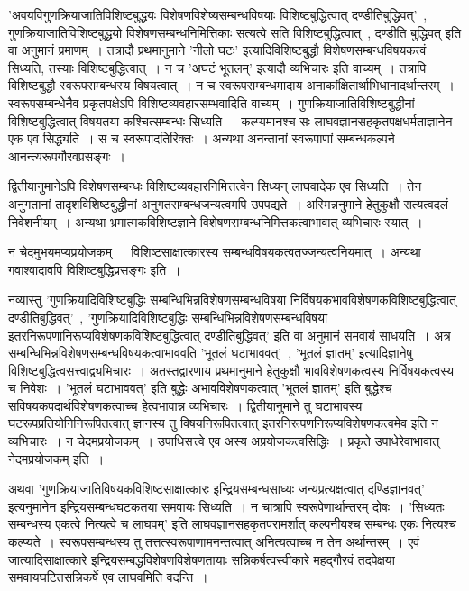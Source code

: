 		'अवयविगुणक्रियाजातिविशिष्टबुद्धयः विशेषणविशेष्यसम्बन्धविषयाः विशिष्टबुद्धित्वात् दण्डीतिबुद्धिवत्'~,  गुणक्रियाजातिविशिष्टबुद्धयो विशेषणसम्बन्धनिमित्तिकाः सत्यत्वे सति विशिष्टबुद्धित्वात्~, दण्डीति बुद्धिवत् इति वा अनुमानं  प्रमाणम्~। तत्रादौ प्रथमानुमाने 'नीलो घटः' इत्यादिविशिष्टबुद्धौ विशेषणसम्बन्धविषयकत्वं सिध्यति, तस्याः विशिष्टबुद्धित्वात्~। न च 'अघटं भूतलम्' इत्यादौ व्यभिचारः इति वाच्यम्~। तत्रापि विशिष्टबुद्धौ स्वरूपसम्बन्धस्य विषयत्वात्~। न च स्वरूपसम्बन्धमादाय अनाकांक्षितार्थाभिधानादर्थान्तरम्~। स्वरूपसम्बन्धेनैव प्रकृतपक्षेऽपि विशिष्टव्यवहारसम्भवादिति वाच्यम्~। गुणक्रियाजातिविशिष्टबुद्धीनां विशिष्टबुद्धित्वात् विषयतया कश्चित्सम्बन्धः सिध्यति~। कल्प्यमानश्च सः लाघवज्ञानसहकृतपक्षधर्मताज्ञानेन एक एव सिद्ध्यति~। स च स्वरूपादतिरिक्तः~। अन्यथा अनन्तानां स्वरूपाणां सम्बन्धकल्पने आनन्त्यरूपगौरवप्रसङ्गः~।

		द्वितीयानुमानेऽपि विशेषणसम्बन्धः विशिष्टव्यवहारनिमित्तत्वेन सिध्यन् लाघवादेक एव सिध्यति~। तेन अनुगतानां तादृशविशिष्टबुद्धीनां अनुगतसम्बन्धजन्यत्वमपि उपपद्यते~। अस्मिन्ननुमाने हेतुकुक्षौ सत्यत्वदलं निवेशनीयम्~। अन्यथा भ्रमात्मकविशिष्टज्ञाने विशेषणसम्बन्धनिमित्तकत्वाभावात् व्यभिचारः स्यात्~। 

		न चेदमुभयमप्यप्रयोजकम्~। विशिष्टसाक्षात्कारस्य सम्बन्धविषयकत्वतज्जन्यत्वनियमात्~। अन्यथा गवाश्वादावपि विशिष्टबुद्धिप्रसङ्गः इति~।

		नव्यास्तु 'गुणक्रियादिविशिष्टबुद्धिः सम्बन्धिभिन्नविशेषणसम्बन्धविषया निर्विषयकभावविशेषणकविशिष्टबुद्धित्वात् दण्डीतिबुद्धिवत्'~, 'गुणक्रियादिविशिष्टबुद्धिः सम्बन्धिभिन्नविशेषणसम्बन्धविषया इतरनिरूपणानिरूप्यविशेषणकविशिष्टबुद्धित्वात् दण्डीतिबुद्धिवत्' इति वा अनुमानं समवायं साधयति~। अत्र सम्बन्धिभिन्नविशेषणसम्बन्धविषयकत्वाभाववति 'भूतलं घटाभाववत्'~, 'भूतलं ज्ञातम्' इत्यादिज्ञानेषु विशिष्टबुद्धित्वसत्त्वाद्व्यभिचारः~। अतस्तद्वारणाय प्रथमानुमाने हेतुकुक्षौ भावविशेषणकत्वस्य निर्विषयकत्वस्य च निवेशः~। 'भूतलं घटाभाववत्' इति बुद्धेः‌ अभावविशेषणकत्वात् 'भूतलं ज्ञातम्' इति बुद्धेश्च सविषयकपदार्थविशेषणकत्वाच्च हेत्वभावान्न व्यभिचारः~। द्वितीयानुमाने तु घटाभावस्य घटरूपप्रतियोगिनिरूपितत्वात् ज्ञानस्य तु विषयनिरूपितत्वात् इतरनिरूपणनिरूप्यविशेषणकत्वमेव इति न व्यभिचारः~। न चेदमप्रयोजकम्~। उपाधिसत्त्वे एव अस्य अप्रयोजकत्वसिद्धिः~। प्रकृते उपाधेरेवाभावात् नेदमप्रयोजकम् इति~।

		अथवा 'गुणक्रियाजातिविषयकविशिष्टसाक्षात्कारः इन्द्रियसम्बन्धसाध्यः जन्यप्रत्यक्षत्वात् दण्डिज्ञानवत्' इत्यनुमानेन इन्द्रियसम्बन्धघटकतया समवायः सिध्यति~। न चात्रापि स्वरूपेणार्थान्तरम् दोषः~। 'सिध्यतः सम्बन्धस्य एकत्वे नित्यत्वे च लाघवम्' इति लाघवज्ञानसहकृतपरामर्शात् कल्पनीयश्च सम्बन्धः एकः नित्यश्च कल्प्यते~। स्वरूपसम्बन्धस्य तु तत्तत्स्वरूपाणामनन्तत्वात् अनित्यत्वाच्च न तेन अर्थान्तरम्~। एवं जात्यादिसाक्षात्कारे इन्द्रियसम्बद्धविशेषणविशेषणतायाः सन्निकर्षत्वस्वीकारे महद्गौरवं तदपेक्षया समवायघटितसन्निकर्षे एव लाघवमिति वदन्ति~।

